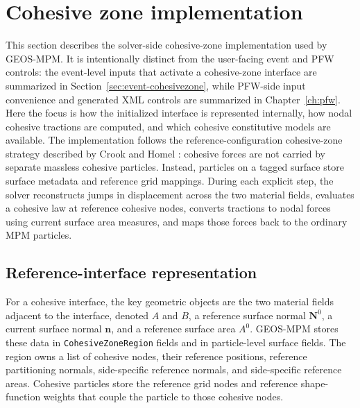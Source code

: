 \section{Cohesive zone implementation}
\label{sec:cz-implementation}
\label{sec:cohesive-zone-implementation}

This section describes the solver-side cohesive-zone implementation used by GEOS-MPM.  It is intentionally distinct from the user-facing event and PFW controls: the event-level inputs that activate a cohesive-zone interface are summarized in Section~\ref{sec:event-cohesivezone}, while PFW-side input convenience and generated XML controls are summarized in Chapter~\ref{ch:pfw}.  Here the focus is how the initialized interface is represented internally, how nodal cohesive tractions are computed, and which cohesive constitutive models are available.  The implementation follows the reference-configuration cohesive-zone strategy described by Crook and Homel \cite{crook2025cohesive}: cohesive forces are not carried by separate massless cohesive particles.  Instead, particles on a tagged surface store surface metadata and reference grid mappings.  During each explicit step, the solver reconstructs jumps in displacement across the two material fields, evaluates a cohesive law at reference cohesive nodes, converts tractions to nodal forces using current surface area measures, and maps those forces back to the ordinary MPM particles.

\subsection{Reference-interface representation}

For a cohesive interface, the key geometric objects are the two material fields adjacent to the interface, denoted $A$ and $B$, a reference surface normal $\mathbf{N}^0$, a current surface normal $\mathbf{n}$, and a reference surface area $A^0$.  GEOS-MPM stores these data in \texttt{CohesiveZoneRegion} fields and in particle-level surface fields.  The region owns a list of cohesive nodes, their reference positions, reference partitioning normals, side-specific reference normals, and side-specific reference areas.  Cohesive particles store the reference grid nodes and reference shape-function weights that couple the particle to those cohesive nodes.

